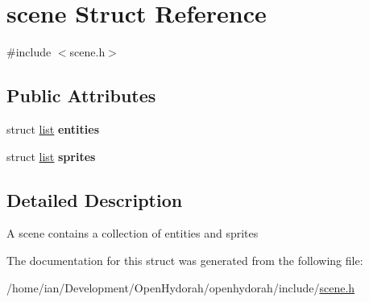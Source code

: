 \hypertarget{structscene}{\section{scene Struct Reference}
\label{structscene}
}


{\ttfamily \#include $<$scene.\-h$>$}

\subsection*{Public Attributes}
\begin{DoxyCompactItemize}
\item 
\hypertarget{structscene_ae16ccb28bb52bb2c3eef4f8e4beeb9cb}{struct \hyperlink{structlist}{list} {\bfseries entities}}\label{structscene_ae16ccb28bb52bb2c3eef4f8e4beeb9cb}

\item 
\hypertarget{structscene_a48297a6a0f770b58336d3e57d7f0f674}{struct \hyperlink{structlist}{list} {\bfseries sprites}}\label{structscene_a48297a6a0f770b58336d3e57d7f0f674}

\end{DoxyCompactItemize}


\subsection{Detailed Description}
A scene contains a collection of entities and sprites 

The documentation for this struct was generated from the following file\-:\begin{DoxyCompactItemize}
\item 
/home/ian/\-Development/\-Open\-Hydorah/openhydorah/include/\hyperlink{scene_8h}{scene.\-h}\end{DoxyCompactItemize}

